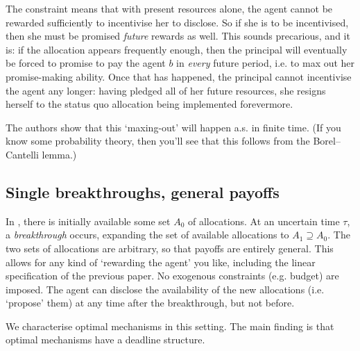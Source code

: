 The constraint means that with present resources alone,
the agent cannot be rewarded sufficiently to incentivise her to disclose.
So if she is to be incentivised, then she must be promised \emph{future} rewards as well.
This sounds precarious, and it is: if the allocation appears frequently enough, then the principal will eventually be forced to promise to pay the agent $b$ in \emph{every} future period, i.e. to max out her promise-making ability. Once that has happened, the principal cannot incentivise the agent any longer: having pledged all of her future resources, she resigns herself to the status quo allocation being implemented forevermore.

The authors show that this `maxing-out' will happen a.s. in finite time. (If you know some probability theory, then you'll see that this follows from the Borel--Cantelli lemma.)



\subsection{Single breakthroughs, general payoffs}
\label{sec:ch4:dynamics:sfb}

In \textcite{sfb}, there is initially available some set $A_0$ of allocations.
At an uncertain time $\tau$, a \emph{breakthrough} occurs, expanding the set of available allocations to $A_1 \supseteq A_0$.
The two sets of allocations are arbitrary, so that payoffs are entirely general.
This allows for any kind of `rewarding the agent' you like, including the linear specification of the previous paper.
No exogenous constraints (e.g. budget) are imposed.
The agent can disclose the availability of the new allocations (i.e. `propose' them) at any time after the breakthrough, but not before.

We characterise optimal mechanisms in this setting. The main finding is that optimal mechanisms have a deadline structure.
